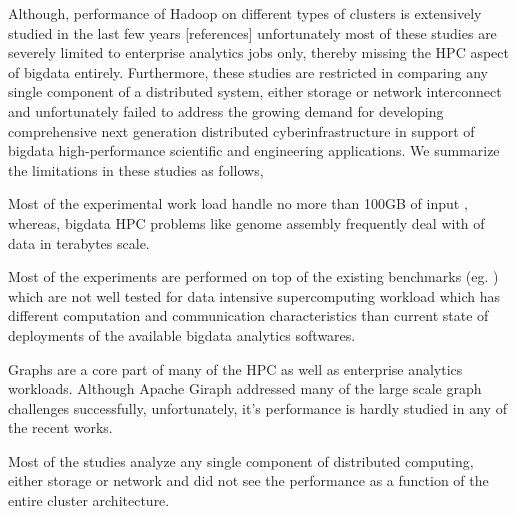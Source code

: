 Although, performance of Hadoop on different types of clusters is extensively studied in the last few years [references] unfortunately most of these studies are severely limited to enterprise analytics jobs only, thereby missing the HPC aspect of bigdata entirely. 
Furthermore, these studies are restricted in comparing any single component of a distributed system, either storage or network interconnect and unfortunately failed to address the growing demand for developing comprehensive next generation distributed cyberinfrastructure in support of bigdata high-performance scientific and engineering applications.   
We summarize the limitations in these studies as follows,
\begin{inparaenum}
\item Most of the experimental work load handle no more than 100GB of input \cite{scaleupscaleout:appuswamy}\cite{scaleupscaleout:chen},
whereas, bigdata HPC problems like genome assembly frequently deal with of data in terabytes scale. 
\item Most of the experiments are performed on top of the existing benchmarks (eg. \cite{bm:hibench}) which are not well tested for data intensive supercomputing workload which has different computation and communication characteristics than current state of deployments of the available bigdata analytics softwares. 
\item Graphs are a core part of many of the HPC as well as enterprise analytics workloads. 
Although Apache Giraph addressed many of the large scale graph challenges successfully, unfortunately, it's performance is hardly studied in any of the recent works.
\item Most of the studies analyze any single component of distributed computing, either storage or network and did not see the performance as a function of the entire cluster architecture. 

\end{inparaenum}
